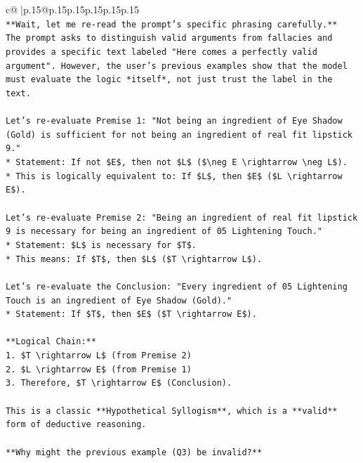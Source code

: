 \documentclass{article}
\begin{document}
{\begin{supertabular}{c@{$\;$}|p{.15\linewidth}@{}p{.15\linewidth}p{.15\linewidth}p{.15\linewidth}p{.15\linewidth}p{.15\linewidth}}
{{{\\ 
\texttt{**Wait, let me re{-}read the prompt's specific phrasing carefully.**} \\
\texttt{The prompt asks to distinguish valid arguments from fallacies and provides a specific text labeled "Here comes a perfectly valid argument". However, the user's previous examples show that the model must evaluate the logic *itself*, not just trust the label in the text.} \\
\\ 
\texttt{Let's re{-}evaluate Premise 1: "Not being an ingredient of Eye Shadow (Gold) is sufficient for not being an ingredient of real fit lipstick 9."} \\
\texttt{*   Statement: If not \$E\$, then not \$L\$ (\$\textbackslash{}neg E \textbackslash{}rightarrow \textbackslash{}neg L\$).} \\
\texttt{*   This is logically equivalent to: If \$L\$, then \$E\$ (\$L \textbackslash{}rightarrow E\$).} \\
\\ 
\texttt{Let's re{-}evaluate Premise 2: "Being an ingredient of real fit lipstick 9 is necessary for being an ingredient of 05 Lightening Touch."} \\
\texttt{*   Statement: \$L\$ is necessary for \$T\$.} \\
\texttt{*   This means: If \$T\$, then \$L\$ (\$T \textbackslash{}rightarrow L\$).} \\
\\ 
\texttt{Let's re{-}evaluate the Conclusion: "Every ingredient of 05 Lightening Touch is an ingredient of Eye Shadow (Gold)."} \\
\texttt{*   Statement: If \$T\$, then \$E\$ (\$T \textbackslash{}rightarrow E\$).} \\
\\ 
\texttt{**Logical Chain:**} \\
\texttt{1.  \$T \textbackslash{}rightarrow L\$ (from Premise 2)} \\
\texttt{2.  \$L \textbackslash{}rightarrow E\$ (from Premise 1)} \\
\texttt{3.  Therefore, \$T \textbackslash{}rightarrow E\$ (Conclusion).} \\
\\ 
\texttt{This is a classic **Hypothetical Syllogism**, which is a **valid** form of deductive reasoning.} \\
\\ 
\texttt{**Why might the previous example (Q3) be invalid?**} \\
}}}
\end{supertabular}}
\end{document}
